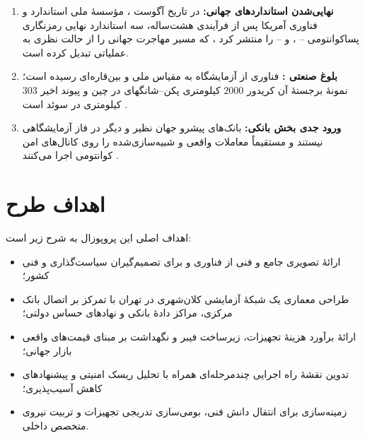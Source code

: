 \begin{enumerate}
\item \textbf{نهایی‌شدن استانداردهای جهانی:} در تاریخ  آگوست ، مؤسسهٔ ملی استاندارد و فناوری آمریکا  پس از فرآیندی هشت‌ساله، سه استاندارد نهایی رمزنگاری پساکوانتومی -- ،  و  -- را منتشر کرد \Cite{nist2024release}، که مسیر مهاجرت جهانی را از حالت نظری به عملیاتی تبدیل کرده است.
\item \textbf{بلوغ صنعتی :} فناوری  از آزمایشگاه به مقیاس ملی و بین‌قاره‌ای رسیده است؛ نمونهٔ برجستهٔ آن کریدور $2000$ کیلومتری پکن--شانگهای در چین \Cite{mdpi2023qkdn} و پیوند اخیر $303$ کیلومتری در سوئد است \Cite{arxiv2606sweden}.
\item \textbf{ورود جدی بخش بانکی:} بانک‌های پیشرو جهان نظیر  و  دیگر در فاز آزمایشگاهی نیستند و مستقیماً معاملات واقعی و شبیه‌سازی‌شده را روی کانال‌های امن کوانتومی اجرا می‌کنند \Cite{techinformed2025banks}.
\end{enumerate}

\section{اهداف طرح}

اهداف اصلی این پروپوزال به شرح زیر است:

\begin{itemize}
\item ارائهٔ تصویری جامع و فنی از فناوری  و  برای تصمیم‌گیران سیاست‌گذاری و فنی کشور؛
\item طراحی معماری یک شبکهٔ آزمایشی  کلان‌شهری در تهران با تمرکز بر اتصال بانک مرکزی، مراکز دادهٔ بانکی و نهادهای حساس دولتی؛
\item ارائهٔ برآورد هزینهٔ تجهیزات، زیرساخت فیبر و نگهداشت بر مبنای قیمت‌های واقعی بازار جهانی؛
\item تدوین نقشهٔ راه اجرایی چندمرحله‌ای همراه با تحلیل ریسک امنیتی و پیشنهادهای کاهش آسیب‌پذیری؛
\item زمینه‌سازی برای انتقال دانش فنی، بومی‌سازی تدریجی تجهیزات و تربیت نیروی متخصص داخلی.
\end{itemize}


